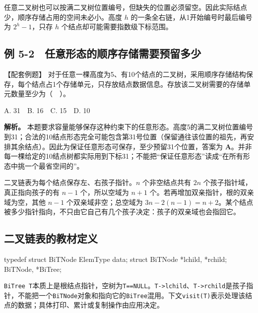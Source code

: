 任意二叉树也可以按满二叉树位置编号，但缺失的位置必须留空。因此实际结点少，顺序存储占用的空间未必小。高度 \(h\) 的一条全右链，从1开始编号时最后编号为 \(2^h-1\)，只存 \(h\) 个结点却可能需要指数级下标范围。

\subsection{例 5-2　任意形态的顺序存储需要预留多少}\label{DS05-ex2}

\begin{example}[配套案例]

【配套例题】 对于任意一棵高度为5、有10个结点的二叉树，采用顺序存储结构保存，每个结点占1个存储单元，只存放结点数据信息。存放该二叉树需要的存储单元数量至少为（　）。

A. 31　B. 16　C. 15　D. 10

\end{example}

\textbf{解析。} 本题要求容量能够保存这种约束下的任意形态。高度5的满二叉树位置编号到31；合法的10结点形态完全可能包含第31号位置（保留通往该位置的祖先，再安排其余结点）。因此为保证任意形态可保存，至少预留31个位置，答案为 \textbf{A}。并非每一棵给定的10结点树都实际用到下标31；不能把``保证任意形态''读成``在所有形态中挑一个最省空间的''。

二叉链表为每个结点保存左、右孩子指针。\(n\) 个非空结点共有 \(2n\) 个孩子指针域，真正指向孩子的有 \(n-1\) 个，所以空域为 \(n+1\) 个。若再增加双亲指针，根的双亲域为空，其他 \(n-1\) 个双亲域非空；总空域为 \(3n-2(n-1)=n+2\)。某个结点被多少指针指向，不只由它自己有几个孩子决定：孩子的双亲域也会指回它。

\subsection{二叉链表的教材定义}\label{DS05-bitree-code}

\par\medskip\noindent\begin{minipage}{\linewidth}
\begin{codeblock}[language=C++]
typedef struct BiTNode {
    ElemType data;
    struct BiTNode *lchild, *rchild;
} BiTNode, *BiTree;
\end{codeblock}
\end{minipage}\par\medskip

\texttt{BiTree T}本质上是根结点指针，空树为\texttt{T=\allowbreak{}=\allowbreak{}NULL}。\texttt{T->\allowbreak{}lchild}、\texttt{T->\allowbreak{}rchild}是孩子指针，不能把一个\texttt{BiTNode}对象和指向它的\texttt{BiTree}混用。下文\texttt{visit(\allowbreak{}T)\allowbreak{}}表示处理该结点的数据；具体打印、累计或复制操作由应用决定。

